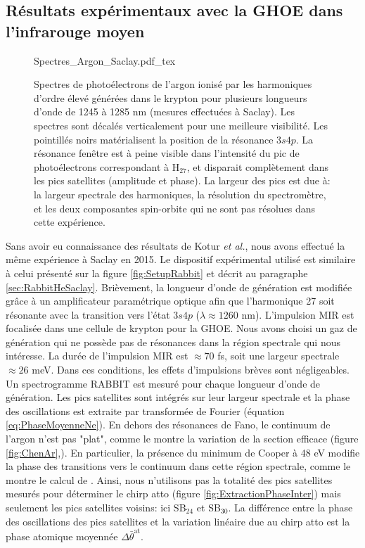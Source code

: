 \subsection{Résultats expérimentaux avec la GHOE dans l'infrarouge moyen}
\begin{figure}[ht]
\centering
\def\svgwidth{1\textwidth}
{Spectres_Argon_Saclay.pdf_tex}
\caption{Spectres de photoélectrons de l'argon ionisé par les harmoniques d'ordre élevé générées dans le krypton pour plusieurs longueurs d'onde de 1245 à 1285 nm (mesures effectuées à Saclay). Les spectres sont décalés verticalement pour une meilleure visibilité. Les pointillés noirs matérialisent la position de la résonance $3s4p$. La résonance fenêtre est à peine visible dans l'intensité du pic de photoélectrons correspondant à H$_{27}$, et disparait complètement dans les pics satellites (amplitude et phase). La largeur des pics est due à: la largeur spectrale des harmoniques, la résolution du spectromètre, et les deux composantes spin-orbite qui ne sont pas résolues dans cette expérience.}
\label{fig:Spectres_Argon_Saclay}
\end{figure}

Sans avoir eu connaissance des résultats de Kotur \textit{et al.}, nous avons effectué la même expérience à Saclay en 2015. Le dispositif expérimental utilisé est similaire à celui présenté sur la figure \ref{fig:SetupRabbit} et décrit au paragraphe \ref{sec:RabbitHeSaclay}. Brièvement, la longueur d'onde de génération est modifiée grâce à un amplificateur paramétrique optique afin que l'harmonique 27 soit résonante avec la transition vers l'état $3s4p$ ($\lambda \approx 1260$ nm). L'impulsion MIR est focalisée dans une cellule de krypton pour la GHOE. Nous avons choisi un gaz de génération qui ne possède pas de résonances dans la région spectrale qui nous intéresse.  La durée de l'impulsion MIR est $\approx 70$ fs, soit une largeur spectrale $\approx 26$ meV. Dans ces conditions, les effets d'impulsions brèves sont négligeables. Un spectrogramme RABBIT est mesuré pour chaque longueur d'onde de génération. Les pics satellites sont intégrés sur leur largeur spectrale et la phase des oscillations est extraite par transformée de Fourier (équation \ref{eq:PhaseMoyenneNe}). En dehors des résonances de Fano, le continuum de l'argon n'est pas "plat", comme le montre la variation de la section efficace (figure \ref{fig:ChenAr},). En particulier, la présence du minimum de Cooper  à 48 eV modifie la phase des transitions vers le continuum dans cette région spectrale, comme le montre le calcul de . Ainsi, nous n'utilisons pas la totalité des pics satellites mesurés pour déterminer le chirp atto (figure \ref{fig:ExtractionPhaseInter}) mais seulement les pics satellites voisins: ici SB$_{24}$ et SB$_{30}$. La différence entre la phase des oscillations des pics satellites et la variation linéaire due au chirp atto est la phase atomique moyennée $\Delta \bar{\theta}^{\text{at}}$.

